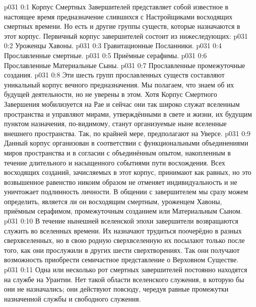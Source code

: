 \author{Божественный Советник и Не Имеющий Имени и Номера}
\vs p031 0:1 Корпус Смертных Завершителей представляет собой известное в настоящее время предназначение слившихся с Настройщиками восходящих смертных времени. Но есть и другие группы существ, которые назначаются в этот корпус. Первичный корпус завершителей состоит из нижеследующих:
\vs p031 0:2 Уроженцы Хавоны.
\vs p031 0:3 Гравитационные Посланники.
\vs p031 0:4 Прославленные смертные.
\vs p031 0:5 Приёмные серафимы.
\vs p031 0:6 Прославленные Материальные Сыны.
\vs p031 0:7 Прославленные промежуточные создания.
\vs p031 0:8 \pc Эти шесть групп прославленных существ составляют уникальный корпус вечного предназначения. Мы полагаем, что знаем об их будущей деятельности, но не уверены в этом. Хотя Корпус Смертного Завершения мобилизуется на Рае и сейчас они так широко служат вселенным пространства и управляют мирами, утверждёнными в свете и жизни, их будущим пунктом назначения, по\hyp{}видимому, станут организуемые ныне вселенные внешнего пространства. Так, по крайней мере, предполагают на Уверсе.
\vs p031 0:9 Данный корпус организован в соответствии с функциональными объединениями миров пространства и в согласии с объединённым опытом, накопленным в течение длительного и насыщенного событиями пути восхождения. Всех восходящих созданий, зачисляемых в этот корпус, принимают как равных, но это возвышенное равенство никоим образом не отменяет индивидуальность и не уничтожает подлинность личности. В общении с завершителем мы сразу можем определить, является ли он восходящим смертным, уроженцем Хавоны, приёмным серафимом, промежуточным созданием или Материальным Сыном.
\vs p031 0:10 В течение нынешней вселенской эпохи завершители возвращаются служить во вселенных времени. Их назначают трудиться поочерёдно в разных сверхвселенных, но в свою родную сверхвселенную их посылают только после того, как они прослужили в других шести сверхтворениях. Так они получают возможность приобрести семичастное представление о Верховном Существе.
\vs p031 0:11 Одна или несколько рот смертных завершителей постоянно находятся на службе на Урантии. Нет такой области вселенского служения, в которую бы они не назначались; они действуют повсюду, чередуя равные промежутки назначенной службы и свободного служения.
